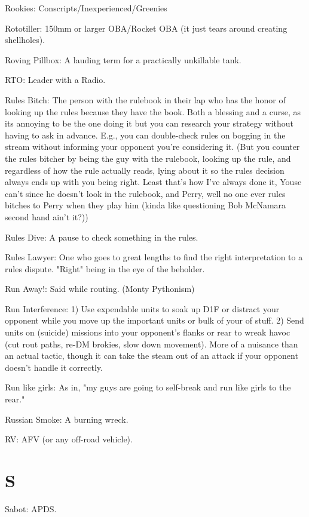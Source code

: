 \documentclass[letterpaper]{article}
\begin{document}
Rookies: Conscripts/Inexperienced/Greenies

Rototiller: 150mm or larger OBA/Rocket OBA (it just tears around creating shellholes).

Roving Pillbox: A lauding term for a practically unkillable tank.

RTO: Leader with a Radio.

Rules Bitch: The person with the rulebook in their lap who has the honor of looking up the rules because they have the book.  Both a blessing and a curse, as its annoying to be the one doing it but you can research your strategy without having to ask in advance.  E.g., you can double-check rules on bogging in the stream without informing your opponent you're considering it. (But you counter the rules bitcher by being the guy with the rulebook, looking up the rule, and regardless of how the rule actually reads, lying about it so the rules decision always ends up with you being right. Least that's how I've always done it, Youse can't since he doesn't look in the rulebook, and Perry, well no one ever rules bitches to Perry when they play him (kinda like questioning Bob McNamara second hand ain't it?))

Rules Dive: A pause to check something in the rules.

Rules Lawyer: One who goes to great lengths to find the right interpretation to a rules dispute. "Right" being in the eye of the beholder.

Run Away!: Said while routing. (Monty Pythonism)

Run Interference: 1) Use expendable units to soak up D1F or distract your opponent while you move up the important units or bulk of your of stuff. 2) Send units on (suicide) missions into your opponent's flanks or rear to wreak havoc (cut rout paths, re-DM brokies, slow down movement). More of a nuisance than an actual tactic, though it can take the steam out of an attack if your opponent doesn't handle it correctly.

Run like girls:  As in, "my guys are going to self-break and run like girls to the rear." 

Russian Smoke: A burning wreck.

RV: AFV (or any off-road vehicle).

\section{S}

Sabot: APDS.
\end{document}
